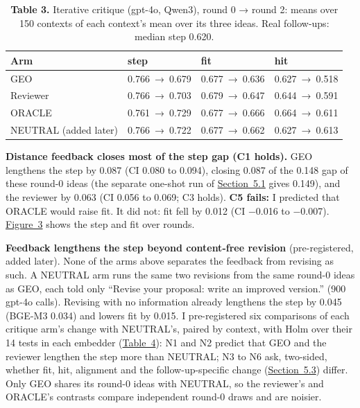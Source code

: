 \documentclass[
  10pt,
]{article}
\begin{document}
\begin{table}[tbp]
\centering\footnotesize\setlength{\tabcolsep}{4pt}
\caption[]{\textbf{Table 3.} Iterative critique (gpt-4o, Qwen3), round 0 → round 2: means over 150 contexts of each context's mean over its three ideas. Real follow-ups: median step 0.620.}\label{tab:3}
\begin{tabular}{@{}llll@{}}
\toprule
Arm & step & fit & hit \\
\midrule
GEO & 0.766~→~0.679 & 0.677~→~0.636 & 0.627~→~0.518 \\
Reviewer & 0.766~→~0.703 & 0.679~→~0.647 & 0.644~→~0.591 \\
ORACLE & 0.761~→~0.729 & 0.677~→~0.666 & 0.664~→~0.611 \\
NEUTRAL (added later) & 0.766~→~0.722 & 0.677~→~0.662 & 0.627~→~0.613 \\
\bottomrule
\end{tabular}
\end{table}

\textbf{Distance feedback closes most of
the step gap (C1 holds).} GEO lengthens
the step by 0.087 (CI 0.080 to 0.094),
closing 0.087 of the 0.148 gap of these
round-0 ideas (the separate one-shot run
of \hyperref[sec:5.1]{Section~5.1} gives
0.149), and the reviewer by 0.063 (CI
0.056 to 0.069; C3 holds). \textbf{C5
fails:} I predicted that ORACLE would
raise fit. It did not: fit fell by 0.012
(CI −0.016 to −0.007).
\hyperref[fig:3]{Figure~3} shows the
step and fit over rounds.

\textbf{Feedback lengthens the step
beyond content-free revision}
(pre-registered, added later). None of
the arms above separates the feedback
from revising as such. A NEUTRAL arm
runs the same two revisions from the
same round-0 ideas as GEO, each told
only ``Revise your proposal: write an
improved version.'' (900 gpt-4o calls).
Revising with no information already
lengthens the step by 0.045 (BGE-M3
0.034) and lowers fit by 0.015. I
pre-registered six comparisons of each
critique arm's change with NEUTRAL's,
paired by context, with Holm over their
14 tests in each embedder
(\hyperref[tab:4]{Table~4}): N1 and N2
predict that GEO and the reviewer
lengthen the step more than NEUTRAL; N3
to N6 ask, two-sided, whether fit, hit,
alignment and the follow-up-specific
change (\hyperref[sec:5.3]{Section~5.3})
differ. Only GEO shares its round-0
ideas with NEUTRAL, so the reviewer's
and ORACLE's contrasts compare
independent round-0 draws and are
noisier.
\end{document}
